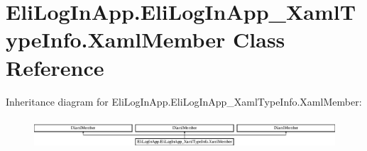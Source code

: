\hypertarget{class_eli_log_in_app_1_1_eli_log_in_app___xaml_type_info_1_1_xaml_member}{}\section{Eli\+Log\+In\+App.\+Eli\+Log\+In\+App\+\_\+\+Xaml\+Type\+Info.\+Xaml\+Member Class Reference}
\label{class_eli_log_in_app_1_1_eli_log_in_app___xaml_type_info_1_1_xaml_member}
Inheritance diagram for Eli\+Log\+In\+App.\+Eli\+Log\+In\+App\+\_\+\+Xaml\+Type\+Info.\+Xaml\+Member\+:\begin{figure}[H]
\begin{center}
\leavevmode
\includegraphics[height=1.159420cm]{dc/d76/class_eli_log_in_app_1_1_eli_log_in_app___xaml_type_info_1_1_xaml_member}
\end{center}
\end{figure}

